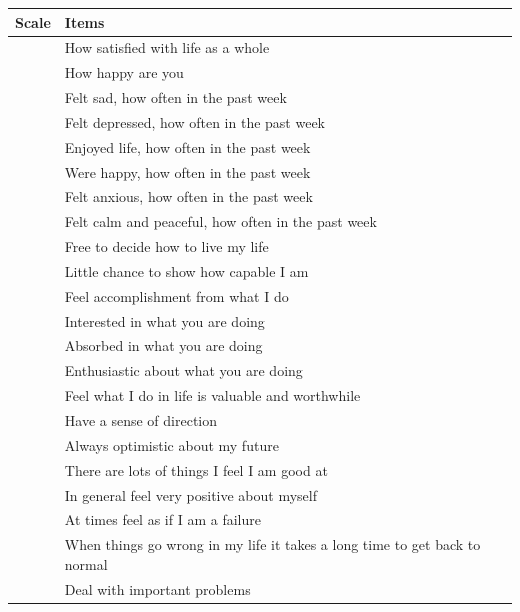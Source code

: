 \documentclass[titlepage,11pt,twoside]{article}
\begin{document}
\begin{table}[h]
\centering
\scriptsize
{}
\bgroup
\def\arraystretch{1.5}
\begin{tabular}{ll}
\hline
Scale & Items \\
\hline
\rowcolor{lightgray} & How satisfied with life as a whole \\
\rowcolor{lightgray}\multirow{-2}{*}{Evaluative wellbeing }& How happy are you\\

\rowcolor{white} & Felt sad, how often in the past week\\
\rowcolor{white} & Felt depressed, how often in the past week\\
\rowcolor{white} & Enjoyed life, how often in the past week\\
\rowcolor{white} & Were happy, how often in the past week\\
\rowcolor{white} & Felt anxious, how often in the past week\\
\rowcolor{white}\multirow{-6}{*}{Emotional wellbeing} & Felt calm and peaceful, how often in the past week\\

\rowcolor{lightgray} & Free to decide how to live my life\\
\rowcolor{lightgray} & Little chance to show how capable I am\\
\rowcolor{lightgray} & Feel accomplishment from what I do\\
\rowcolor{lightgray} & Interested in what you are doing\\
\rowcolor{lightgray} & Absorbed in what you are doing\\
\rowcolor{lightgray} & Enthusiastic about what you are doing\\
\rowcolor{lightgray} & Feel what I do in life is valuable and worthwhile\\
\rowcolor{lightgray} & Have a sense of direction\\
\rowcolor{lightgray} & Always optimistic about my future\\
\rowcolor{lightgray} & There are lots of things I feel I am good at\\
\rowcolor{lightgray} & In general feel very positive about myself\\
\rowcolor{lightgray} & At times feel as if I am a failure\\
\rowcolor{lightgray} & When things go wrong in my life it takes a long time to get back to normal\\
\rowcolor{lightgray}\multirow{-14}{*}{Functioning} & Deal with important problems\\


\end{tabular}
\end{table}
\end{document}
